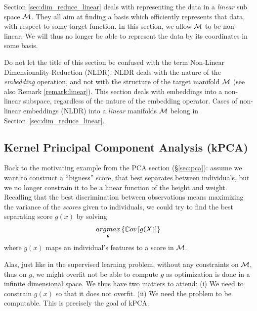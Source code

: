 Section \ref{sec:dim_reduce_linear} deals with representing the data in a \emph{linear} sub space $\mathcal{M}$. They all aim at finding a basis which efficiently represents that data, with respect to some target function. 
In this section, we allow $\mathcal{M}$ to be non-linear. 
We will thus no longer be able to represent the data by its coordinates in some basis.


\begin{remark}
\label{remark:nldr}
	Do not let the title of this section be confused with the term Non-Linear Dimensionality-Reduction (NLDR).
	NLDR deals with the nature of the \emph{embedding} operation, and not with the structure of the target manifold $\mathcal{M}$ (see also Remark \ref{remark:linear}).
	This section deals with embeddings into a non-linear subspace, regardless of the nature of the embedding operator.
	Cases of non-linear embeddings (NLDR) into a \emph{linear} manifolds $\mathcal{M}$ belong in Section~\ref{sec:dim_reduce_linear}.
\end{remark}




\subsection{Kernel Principal Component Analysis (kPCA)}
\label{sec:kpca}

Back to the motivating example from the PCA section (\S\ref{sec:pca}): assume we want to construct a ``bigness'' score, that best separates between individuals, but we no longer constrain it to be a linear function of the height and weight.
Recalling that the best discrimination between observations means maximizing the variance of the \emph{scores} given to individuals, we could try to find the best separating score $g(x)$ by solving 
\begin{align}
\label{eq:kpca_wrong}
	\mathop{argmax}_{g}\left\{ \mathbb{C}ov \left[ g(X) \right] \right\}
\end{align}
where $g(x)$ maps an individual's features to a score in $\mathcal{M}$.

Alas, just like in the supervised learning problem, without any constraints on $\mathcal{M}$, thus on $g$, we might overfit \andor not be able to compute $g$ as optimization is done in a infinite dimensional space. 
We thus have two matters to attend:
(i) We need to constrain $g(x)$ so that it does not overfit.
(ii) We need the problem to be computable.
This is precisely the goal of kPCA. 

